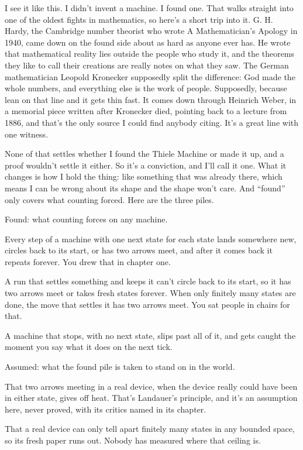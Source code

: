 \documentclass[11pt,twoside]{article}
\theoremstyle{thielethm}
\theoremstyle{thieledef}
\theoremstyle{thieledef}
\theoremstyle{thieledef}
\theoremstyle{thielethm}
\theoremstyle{thieleobs}
\theoremstyle{thielethm}
\begin{document}
I see it like this. I didn't invent a machine. I found one. That walks straight into one of the oldest fights in mathematics, so here's a short trip into it. G. H. Hardy, the Cambridge number theorist who wrote A Mathematician's Apology in 1940, came down on the found side about as hard as anyone ever has. He wrote that mathematical reality lies outside the people who study it, and the theorems they like to call their creations are really notes on what they saw. The German mathematician Leopold Kronecker supposedly split the difference: God made the whole numbers, and everything else is the work of people. Supposedly, because lean on that line and it gets thin fast. It comes down through Heinrich Weber, in a memorial piece written after Kronecker died, pointing back to a lecture from 1886, and that's the only source I could find anybody citing. It's a great line with one witness.

None of that settles whether I found the Thiele Machine or made it up, and a proof wouldn't settle it either. So it's a conviction, and I'll call it one. What it changes is how I hold the thing: like something that was already there, which means I can be wrong about its shape and the shape won't care. And ``found'' only covers what counting forced. Here are the three piles.

Found: what counting forces on any machine.

Every step of a machine with one next state for each state lands somewhere new, circles back to its start, or has two arrows meet, and after it comes back it repeats forever. You drew that in chapter one.

A run that settles something and keeps it can't circle back to its start, so it has two arrows meet or takes fresh states forever. When only finitely many states are done, the move that settles it has two arrows meet. You sat people in chairs for that.

A machine that stops, with no next state, slips past all of it, and gets caught the moment you say what it does on the next tick.

Assumed: what the found pile is taken to stand on in the world.

That two arrows meeting in a real device, when the device really could have been in either state, gives off heat. That's Landauer's principle, and it's an assumption here, never proved, with its critics named in its chapter.

That a real device can only tell apart finitely many states in any bounded space, so its fresh paper runs out. Nobody has measured where that ceiling is.
\end{document}
